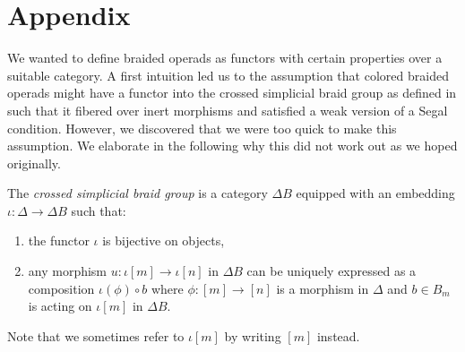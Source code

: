 \section{Appendix}


We wanted to define braided operads as functors with certain properties over a suitable category. 
A first intuition led us to the assumption that colored braided operads might 
have a functor into the crossed simplicial braid group as defined in \cite{Dyckerhoff} such that
it fibered over inert morphisms and satisfied a weak version of a Segal condition.
However, we discovered that we were too quick to make this assumption. 
We elaborate in the following why this did not work out as we hoped originally.

\begin{defin}\label{crossed_braid} The {\em crossed simplicial braid group} is a category $\Delta B$ equipped with an embedding
	$\iota:\Delta \to \Delta B$ such that:
	\begin{enumerate}
		\item the functor $\iota$ is bijective on objects,
		\item any morphism $u: \iota[m] \to \iota[n]$ in $\Delta B$ can be uniquely expressed as 
			a composition $\iota(\phi) \circ b$ where $\phi: [m] \to [n]$ is a morphism in
			$\Delta$ and $b \in B_m$ is acting on $\iota[m]$ in $\Delta B$.
	\end{enumerate}
    Note that we sometimes refer to $\iota[m]$ by writing $[m]$ instead.
\end{defin}

